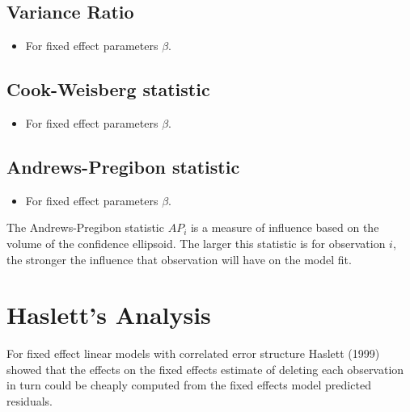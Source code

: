 \documentclass[12pt, a4paper]{report}
\theoremstyle{plain}
\theoremstyle{definition}
\theoremstyle{remark}
\begin{document}
\subsection{Variance Ratio} %
\begin{itemize}
\item For fixed effect parameters $\beta$.
\end{itemize}

\subsection{Cook-Weisberg statistic} %
\begin{itemize}
\item For fixed effect parameters $\beta$.
\end{itemize}

\subsection{Andrews-Pregibon statistic} %
\begin{itemize}
\item For fixed effect parameters $\beta$.
\end{itemize}
The Andrews-Pregibon statistic $AP_{i}$ is a measure of influence based on the volume of the confidence ellipsoid.
The larger this statistic is for observation $i$, the stronger the influence that observation will have on the model fit.


\newpage
\section{Haslett's Analysis} %
For fixed effect linear models with correlated error structure Haslett (1999) showed that the effects on
the fixed effects estimate of deleting each observation in turn could be cheaply computed from the fixed effects model predicted residuals.

\end{document}
